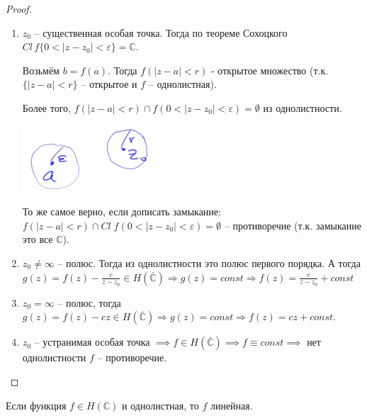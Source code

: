\begin{proof}

    \begin{enumerate}
        \item {
            $z_0$ -- существенная особая точка. Тогда по теореме Сохоцкого 
            $Cl \, f \{ 0 < |z - z_0| < \varepsilon \} = \mathbb{C}$.

            Возьмём $b = f(a)$. Тогда $f(|z - a| < r)$ - открытое множество (т.к. $\{|z-a| < r\}$ -- открытое и $f$ -- однолистная).
            
            Более того, $f(|z - a| < r) \cap f(0 < |z - z_0| < \varepsilon) = \emptyset$ из однолистности.


            \begin{center}
                \includegraphics[width=5    cm]{assets/04-functions-of-complex-variables/fractional-linear-functions.png}
            \end{center}

            То же самое верно, если дописать замыкание: $f(|z - a| < r) \cap Cl \; f(0 < |z - z_0| < \varepsilon) = \emptyset$ --  противоречие (т.к. замыкание это все $\mathbb{C}$).
        }
        \item {
            $z_0 \neq \infty$ -- полюс. Тогда из однолистности это полюс первого порядка. А тогда
            $g(z) = f(z) - \frac{c}{z - z_0} \in H(\bar{\mathbb{C}}) \Rightarrow g(z) = const \Rightarrow f(z) = \frac{c}{z - z_0} + const$ 
        }
        \item {
            $z_0 = \infty$ -- полюс, тогда $g(z) = f(z) - cz \in H(\bar{\mathbb{C}}) \Rightarrow g(z) = const \Rightarrow f(z) = cz + const$.
        }
        \item {
            $z_0$ -- устранимая особая точка $\implies f \in H(\bar{\mathbb{C}}) \implies f \equiv const \implies$ нет однолистности $f$ -- противоречие.
        }
    \end{enumerate}
\end{proof}

\begin{consequence}
    Если функция $f \in H(\mathbb{C})$ и однолистная, то $f$ линейная.
\end{consequence}

